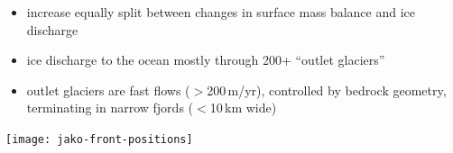 \documentclass[hide notes,intlimits]{beamer}
\begin{document}
{
%
} 


\begin{frame}[plain]
    \begin{itemize}
    \item increase equally split between changes in surface mass balance and ice discharge
    \end{itemize}
\end{frame}


\begin{frame}[plain]
    \begin{itemize}
    \item ice discharge to the ocean mostly through 200+ ``outlet glaciers''
    \item outlet glaciers are fast flows ($>$200\,m/yr), controlled by bedrock geometry, terminating in narrow fjords ($<$10\,km wide)
    \end{itemize}
    \begin{center}
      \texttt{[image: jako-front-positions]}
    \end{center}
\end{frame}
 
\end{document}
